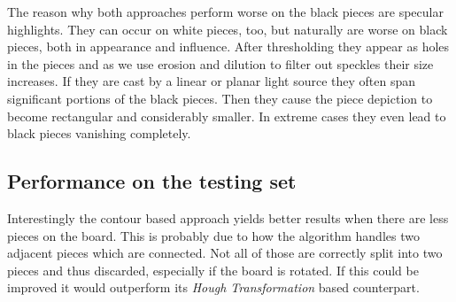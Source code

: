 	The reason why both approaches perform worse on the black pieces are specular highlights. They can occur on white pieces, too, but naturally are worse on black pieces, both in appearance and influence. After thresholding they appear as holes in the pieces and as we use erosion and dilution to filter out speckles their size increases. If they are cast by a linear or planar light source they often span significant portions of the black pieces. Then they cause the piece depiction to become rectangular and considerably smaller. In extreme cases they even lead to black pieces vanishing completely.

	\subsection{Performance on the testing set}
	\label{evaluation-occluded-performance}
	
	Interestingly the contour based approach yields better results when there are less pieces on the board. This is probably due to how the algorithm handles two adjacent pieces which are connected. Not all of those are correctly split into two pieces and thus discarded, especially if the board is rotated. If this could be improved it would outperform its \emph{Hough Transformation} based counterpart.

